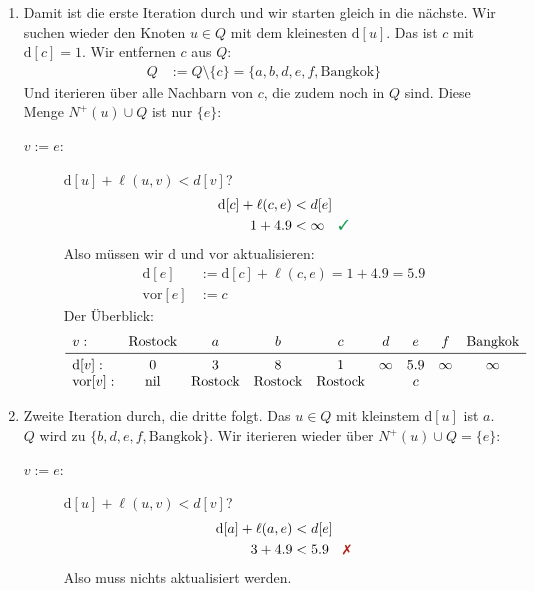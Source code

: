 \documentclass[
a4paper, %
11pt,
]
{scrartcl}
\newcommand{\dist}{\text{d}}
\newcommand{\vor}{\text{vor}}
\newcommand{\nil}{\text{nil}}
\begin{document}
\begin{enumerate}
  \item Damit ist die erste Iteration durch und wir starten gleich in die
    nächste.  Wir suchen wieder den Knoten $u \in Q$ mit dem kleinesten
    $\dist[u]$. Das ist $c$ mit $\dist[c] = 1$. Wir entfernen $c$ aus $Q$:
    \begin{align*}
      Q & := Q \setminus \{ c \} = \{ a, b, d, e, f, \text{Bangkok}\}
    \end{align*}
    Und iterieren über alle Nachbarn von $c$, die zudem noch in $Q$ sind. Diese
    Menge $N^+(u) \cup Q$ ist nur $\{ e \}$:
    \begin{description}
      \item[$v := e$:] $\dist[u] + \ell(u, v) < d[v]$?
        \begin{align*}
          \dist[c] + \ell(c, e) & < d[e]\\
          1 + \num{4,9} & < \infty \quad \richtig
        \end{align*}
        Also müssen wir $\dist$ und $\vor$ aktualisieren:
        \begin{align*}
          \dist[e] & := \dist[c] + \ell(c, e)
            = 1 + \num{4,9} = \num{5,9}\\
          \vor[e] & := c
        \end{align*}
        Der Überblick:
        \begin{align*}
          \begin{array}{lcccccccc}
            v: & \text{Rostock} & a & b & c & d & e & f & \text{Bangkok}\\
            \midrule
            \dist[v]:
              & 0 & 3 & 8 & 1 & \infty & \num{5,9} & \infty & \infty\\
            \vor[v]:
              & \nil & \text{Rostock} & \text{Rostock} & \text{Rostock}
              & & c
          \end{array}
        \end{align*}
    \end{description}

  \item Zweite Iteration durch, die dritte folgt.
    Das $u \in Q$ mit kleinstem $\dist[u]$ ist $a$.
    $Q$ wird zu $\{ b, d, e, f, \text{Bangkok}\}$.
    Wir iterieren wieder über $N^+(u) \cup Q = \{ e \}$:
    \begin{description}
      \item[$v := e$:] $\dist[u] + \ell(u, v) < d[v]$?
        \begin{align*}
          \dist[a] + \ell(a, e) & < d[e]\\
          3 + \num{4,9} & < \num{5,9} \quad \falsch
        \end{align*}
        Also muss nichts aktualisiert werden.
    \end{description}


\end{enumerate}
\end{document}
